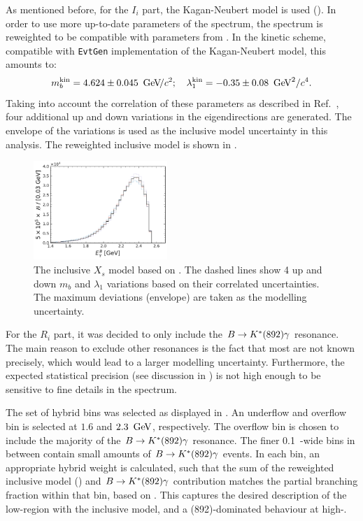 As mentioned before, for the $I_i$ part, the Kagan-Neubert model is used ().
In order to use more up-to-date parameters of the spectrum, the spectrum is reweighted to be compatible with parameters from .
In the kinetic scheme, compatible with \texttt{EvtGen} implementation of the Kagan-Neubert model, this amounts to:
\begin{equation}\label{eq:simba_result_kinetic}
    m_b^{\mathrm{kin}} =4.624 \pm 0.045~{\mathrm{\,Ge\kern -0.1em V\!/}c^2};  \quad \lambda^{\mathrm{kin}}_1 = -0.35\pm0.08~\mathrm{\,Ge\kern -0.1em V}^2/c^4.
\end{equation}
Taking into account the correlation of these parameters as described in Ref.~\cite{Bernlochner:2020jlt}, four additional up and down variations in the eigendirections are generated. 
The envelope of the variations is used as the inclusive model uncertainty in this analysis.
The reweighted inclusive model is shown in .
\begin{figure}[hbtp!]
    \centering
    \includegraphics[width=0.45\textwidth]{figures/data_samples/xs_model_inclusive.pdf}
    \caption{\label{fig:inclusive_reweighted}The inclusive $X_s$ model based on .
    The dashed lines show 4 up and down $m_b$ and $\lambda_1$ variations based on their correlated uncertainties.
    The maximum deviations (envelope) are taken as the modelling uncertainty.}
\end{figure}

For the $R_i$ part, it was decided to only include the $B\rightarrow K^*(892)\gamma$ resonance.
The main reason to exclude other resonances is the fact that most are not known precisely, which would lead to a larger modelling uncertainty.
Furthermore, the expected statistical precision (see discussion in ) is not high enough to be sensitive to fine details in the spectrum.

The set of hybrid bins was selected as displayed in .
An underflow and overflow bin is selected at $1.6$ and $2.3~\mathrm{\,Ge\kern -0.1em V}$, respectively.
The overflow bin is chosen to include the majority of the $B\rightarrow K^*(892)\gamma$ resonance.
The finer 0.1~\gev-wide bins in between contain small amounts of $B\rightarrow K^*(892)\gamma$ events.
In each \EB bin, an appropriate hybrid weight is calculated, such that the sum of the reweighted inclusive model () and \mbox{$B\rightarrow K^*(892)\gamma$} contribution matches the partial branching fraction within that \EB bin, based on .
This captures the desired description of the low-\EB region with the inclusive model, and a \Kstar(892)-dominated behaviour at high-\EB.

